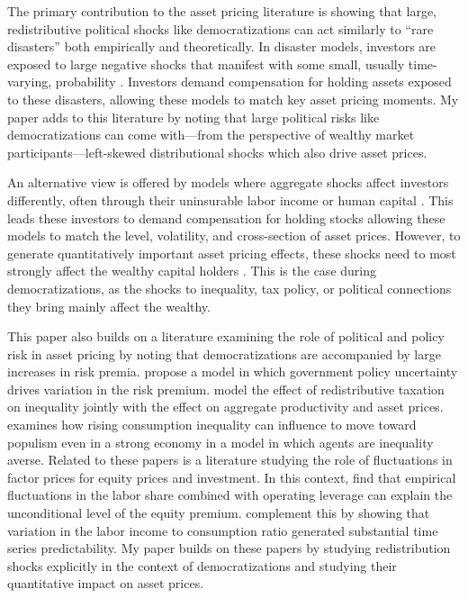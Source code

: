 \documentclass[12pt]{article}
\numberwithin{equation}{section}
\begin{document}
The primary contribution to the asset pricing literature is showing that large, redistributive political shocks like democratizations can act similarly to ``rare disasters'' both empirically and theoretically. In disaster models, investors are exposed to large negative shocks that manifest with some small, usually time-varying, probability \citep*{Rietz1988,Barro2006a,Gabaix2012,Wachter2013}. Investors demand compensation for holding assets exposed to these disasters, allowing these models to match key asset pricing moments. My paper adds to this literature by noting that large political risks like democratizations can come with---from the perspective of wealthy market participants---left-skewed distributional shocks which also drive asset prices.

An alternative view is offered by models where aggregate shocks affect investors differently, often through their uninsurable labor income or human capital \citep{Mankiw1986, Constantinides1996,Constantinides2017, Schmidt2016,Paron2021}.  This leads these investors to demand compensation for holding stocks allowing these models to match the level, volatility, and cross-section of asset prices. However, to generate quantitatively important asset pricing effects, these shocks need to most strongly affect the wealthy capital holders \citep*{Catherine2021}. This is the case during democratizations, as the shocks to inequality, tax policy, or political connections they bring mainly affect the wealthy.

This paper also builds on a literature examining the role of political and policy risk in asset pricing by noting that democratizations are accompanied by large increases in risk premia. \cite*{Pastor2012,Pastor2013} propose a model in which government policy uncertainty drives variation in the risk premium.  \cite*{Pastor2016} model the effect of redistributive taxation on inequality jointly with the effect on aggregate productivity and asset prices.  \cite{Pastor2021} examines how rising consumption inequality can influence to move toward populism even in a strong economy in a model in which agents are inequality averse.  Related to these papers is a literature studying the role of fluctuations in factor prices for equity prices and investment. In this context, \cite{Danthine2002} find that empirical fluctuations in the labor share combined with operating leverage can explain the unconditional level of the equity premium. \cite{Santos2005} complement this by showing that variation in the labor income to consumption ratio generated substantial time series predictability.  My paper builds on these papers by studying redistribution shocks explicitly in the context of democratizations and studying their quantitative impact on asset prices.
\end{document}
